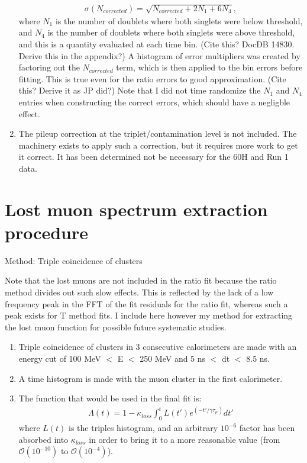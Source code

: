 \begin{enumerate}
{			\begin{gather}
				\sigma(N_{corrected}) = \sqrt{N_{corrected} + 2 N_{1} + 6 N_{4}},
			\end{gather}
		where $N_{1}$ is the number of doublets where both singlets were below threshold, and $N_{4}$ is the number of doublets where both singlets were above threshold, and this is a quantity evaluated at each time bin. (Cite this? DocDB 14830. Derive this in the appendix?) A histogram of error multipliers was created by factoring out the $N_{corrected}$ term, which is then applied to the bin errors before fitting. This is true even for the ratio errors to good approximation. (Cite this? Derive it as JP did?) Note that I did not time randomize the $N_{1}$ and $N_{4}$ entries when constructing the correct errors, which should have a negligble effect.}
		\item{The pileup correction at the triplet/contamination level is not included. The machinery exists to apply such a correction, but it requires more work to get it correct. It has been determined not be necessary for the 60H and Run 1 data.}
	\end{enumerate}


\section{Lost muon spectrum extraction procedure}

	Method: Triple coincidence of clusters

	Note that the lost muons are not included in the ratio fit because the ratio method divides out such slow effects. This is reflected by the lack of a low frequency peak in the FFT of the fit residuals for the ratio fit, whereas such a peak exists for T method fits. I include here however my method for extracting the lost muon function for possible future systematic studies.

	\begin{enumerate}
		\item{Triple coincidence of clusters in 3 consecutive calorimeters are made with an energy cut of 100 MeV $<$ E $<$ 250 MeV and 5 ns $<$ dt $<$ 8.5 ns.}
		\item{A time histogram is made with the muon cluster in the first calorimeter.}
		\item{The function that would be used in the final fit is:
			\begin{gather}
				\Lambda(t) = 1 - \kappa_{loss} \int_{0}^{t} L(t')e^{(-t'/\gamma\tau_{\mu})} dt'
			\end{gather}
		where $L(t)$ is the triples histogram, and an arbitrary $10^{-6}$ factor has been absorbed into $\kappa_{loss}$ in order to bring it to a more reasonable value (from $\mathcal{O}(10^{-10})$ to $\mathcal{O}(10^{-4})$).}
	\end{enumerate}


